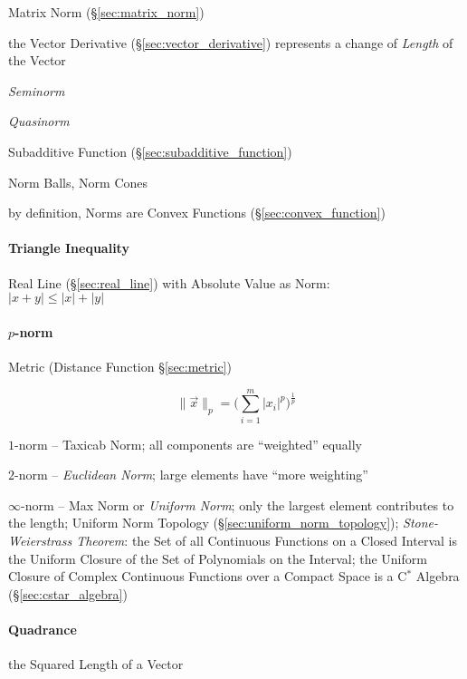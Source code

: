\fist Matrix Norm (\S\ref{sec:matrix_norm})

the Vector Derivative (\S\ref{sec:vector_derivative}) represents a change of
\emph{Length} of the Vector

\emph{Seminorm}

\emph{Quasinorm}

Subadditive Function (\S\ref{sec:subadditive_function})

Norm Balls, Norm Cones

by definition, Norms are Convex Functions (\S\ref{sec:convex_function})



\paragraph{Triangle Inequality}\label{sec:triangle_inequality}\hfill

Real Line (\S\ref{sec:real_line}) with Absolute Value as Norm:\\
$|x + y| \leq |x| + |y|$



\paragraph{$p$-norm}\label{sec:p_norm}\hfill

\fist Metric (Distance Function \S\ref{sec:metric})

\[
  \|\vec{x}\|_p = \Big(\sum_{i=1}^m|x_i|^p\Big)^{\frac{1}{p}}
\]

$1$-norm -- Taxicab Norm; all components are ``weighted'' equally

$2$-norm -- \emph{Euclidean Norm}; large elements have ``more weighting''

$\infty$-norm -- Max Norm or \emph{Uniform Norm}; only the largest element
contributes to the length; Uniform Norm Topology
(\S\ref{sec:uniform_norm_topology}); \emph{Stone-Weierstrass Theorem}: the Set
of all Continuous Functions on a Closed Interval is the Uniform Closure of the
Set of Polynomials on the Interval;
the Uniform Closure of Complex Continuous Functions over a Compact Space is a
C$^*$ Algebra (\S\ref{sec:cstar_algebra})



\paragraph{Quadrance}\label{sec:quadrance}\hfill

the Squared Length of a Vector

